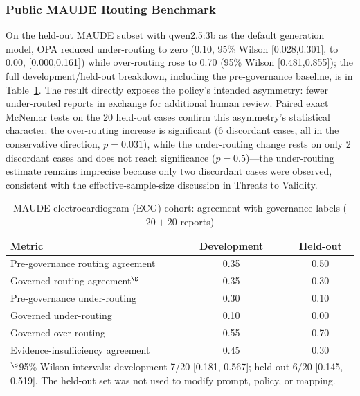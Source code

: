 \documentclass[journal,twoside,web]{ieeecolor}
\begin{document}
\subsubsection{Public MAUDE Routing Benchmark}

On the held-out MAUDE subset with qwen2.5:3b as the default generation model, OPA reduced under-routing to zero (0.10, 95\% Wilson [0.028,0.301], to 0.00, [0.000,0.161]) while over-routing rose to 0.70 (95\% Wilson [0.481,0.855]); the full development/held-out breakdown, including the pre-governance baseline, is in Table~\ref{tab:maude-governance}. The result directly exposes the policy's intended asymmetry: fewer under-routed reports in exchange for additional human review. Paired exact McNemar tests on the 20 held-out cases confirm this asymmetry's statistical character: the over-routing increase is significant (6 discordant cases, all in the conservative direction, $p=0.031$), while the under-routing change rests on only 2 discordant cases and does not reach significance ($p=0.5$)---the under-routing estimate remains imprecise because only two discordant cases were observed, consistent with the effective-sample-size discussion in Threats to Validity.

\begin{table}[t]
\centering
\caption{MAUDE electrocardiogram (ECG) cohort: agreement with governance labels ($20+20$ reports)}
\label{tab:maude-governance}
\scriptsize
\setlength{\tabcolsep}{2.0pt}
\begin{tabular}{p{}cc}
\hline
\textbf{Metric} & \textbf{Development} & \textbf{Held-out} \\
\hline
Pre-governance routing agreement & 0.35 & 0.50 \\
Governed routing agreement$^\S$ & 0.35 & 0.30 \\
Pre-governance under-routing & 0.30 & 0.10 \\
Governed under-routing & 0.10 & 0.00 \\
Governed over-routing & 0.55 & 0.70 \\
Evidence-insufficiency agreement & 0.45 & 0.30 \\
\hline
\multicolumn{3}{p{0.94\columnwidth}}{\scriptsize $^\S$95\% Wilson intervals: development 7/20 [0.181, 0.567]; held-out 6/20 [0.145, 0.519]. The held-out set was not used to modify prompt, policy, or mapping.} \\
\end{tabular}
\end{table}
\end{document}
